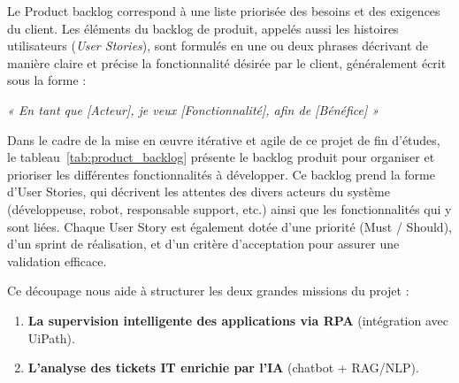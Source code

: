 Le Product backlog correspond à une liste priorisée des besoins et des exigences du client. Les éléments du backlog de produit, appelés aussi les histoires utilisateurs (\textit{User Stories}), sont formulés en une ou deux phrases décrivant de manière claire et précise la fonctionnalité désirée par le client, généralement écrit sous la forme : 
\begin{center}
    \textit{« En tant que [Acteur], je veux [Fonctionnalité], afin de [Bénéfice] »}
\end{center}

Dans le cadre de la mise en œuvre itérative et agile de ce projet de fin d’études, le tableau~\ref{tab:product_backlog} présente le backlog produit pour organiser et prioriser les différentes fonctionnalités à développer. Ce backlog prend la forme d’User Stories, qui décrivent les attentes des divers acteurs du système (développeuse, robot, responsable support, etc.) ainsi que les fonctionnalités qui y sont liées. Chaque User Story est également dotée d’une priorité (Must / Should), d’un sprint de réalisation, et d’un critère d’acceptation pour assurer une validation efficace.

Ce découpage nous aide à structurer les deux grandes missions du projet :
\begin{enumerate}
    \item \textbf{La supervision intelligente des applications via RPA} (intégration avec UiPath).
    \item \textbf{L’analyse des tickets IT enrichie par l’IA} (chatbot + RAG/NLP).
\end{enumerate}

